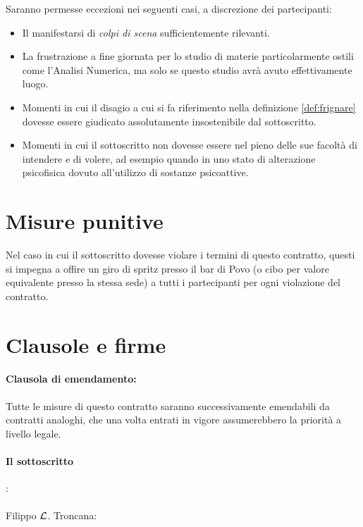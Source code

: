 \documentclass{article}
\begin{document}
Saranno permesse eccezioni nei seguenti casi, a discrezione dei partecipanti:\begin{itemize}
    \item Il manifestarsi di \textit{colpi di scena} sufficientemente rilevanti.
    \item La frustrazione a fine giornata per lo studio di materie particolarmente ostili come l'Analisi Numerica, ma solo se questo studio avrà avuto effettivamente luogo.
    \item Momenti in cui il disagio a cui si fa riferimento nella definizione \ref{def:frignare} dovesse essere giudicato assolutamente insostenibile dal sottoscritto.
    \item Momenti in cui il sottoscritto non dovesse essere nel pieno delle sue facoltà di intendere e di volere, ad esempio quando in uno stato di alterazione psicofisica dovuto all'utilizzo di sostanze psicoattive.
\end{itemize}

\section{Misure punitive}

Nel caso in cui il sottoscritto dovesse violare i termini di questo contratto, questi si impegna a offire un giro di spritz presso il bar di Povo (o cibo per valore equivalente presso la stessa sede) a tutti i partecipanti per ogni violazione del contratto.

\pagebreak

\section{Clausole e firme}

\paragraph{Clausola di emendamento:} Tutte le misure di questo contratto saranno successivamente emendabili da contratti analoghi, che una volta entrati in vigore assumerebbero la priorità a livello legale.

\paragraph{Il sottoscritto}:
\\
\bigskip
\\
Filippo $\mathcal{L}$. Troncana: \hrulefill
\end{document}
